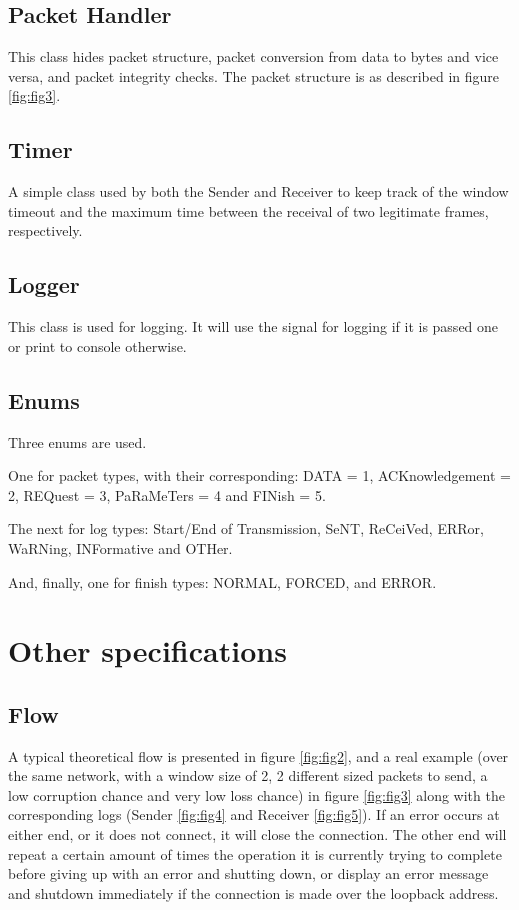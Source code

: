 \documentclass[12pt]{article}
\begin{document}
\subsection{Packet Handler}

This class hides packet structure, packet conversion from data to bytes and vice versa, and packet integrity checks. The packet structure is as described in figure  \ref{fig:fig3}.

\subsection{Timer}

A simple class used by both the Sender and Receiver to keep track of the window timeout and the maximum time between the receival of two legitimate frames, respectively.

\subsection{Logger}

This class is used for logging. It will use the signal for logging if it is passed one or print to console otherwise.

\subsection{Enums}

Three enums are used.

One for packet types, with their corresponding: DATA = 1, ACKnowledgement = 2, REQuest = 3, PaRaMeTers = 4 and FINish = 5.

The next for log types: Start/End of Transmission, SeNT, ReCeiVed, ERRor, WaRNing, INFormative and OTHer.

And, finally, one for finish types: NORMAL, FORCED, and ERROR.

\section{Other specifications}

\subsection{Flow}

A typical theoretical flow is presented in figure \ref{fig:fig2}, and a real example (over the same network, with a window size of 2, 2 different sized packets to send, a low corruption chance and very low loss chance) in figure \ref{fig:fig3} along with the corresponding logs (Sender \ref{fig:fig4} and Receiver \ref{fig:fig5}). If an error occurs at either end, or it does not connect, it will close the connection. The other end will repeat a certain amount of times the operation it is currently trying to complete before giving up with an error and shutting down, or display an error message and shutdown immediately if the connection is made over the loopback address.
\end{document}
